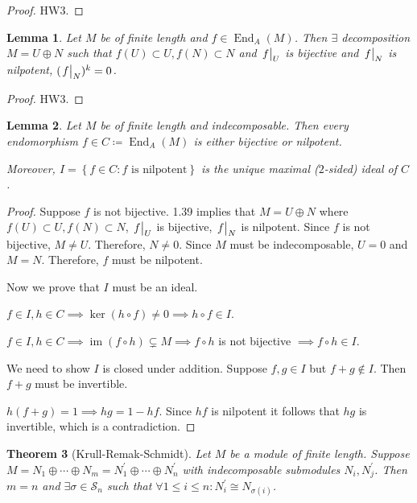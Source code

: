 \documentclass{article}
\theoremstyle{definition}
\theoremstyle{plain}
\newtheorem{theorem}{Theorem}[section]
\newtheorem{lemma}[theorem]{Lemma}
\theoremstyle{remark}
\begin{document}
    \begin{proof}
        HW3.
    \end{proof}

    \begin{lemma}
        Let \(M\) be of finite length and \(f\in \operatorname{End}_A(M)\). Then \(\exists\) decomposition \(M = U \oplus N\) such that \(f(U) \subset U, f(N) \subset N\) and \(\eval{f}_{U}\) is bijective and \(\eval{f}_{N}\) is nilpotent, \((\eval{f}_{N})^k = 0\). 
    \end{lemma}

    \begin{proof}
        HW3.
    \end{proof}

    \begin{lemma}
        Let \(M\) be of finite length and indecomposable. Then every endomorphism \(f\in C \coloneqq \operatorname{End}_A(M)\) is either bijective or nilpotent.

        Moreover, \(I = \left\{ f\in C : f \text{ is nilpotent} \right\} \) is the unique maximal (\(2\)-sided) ideal of \(C\).
    \end{lemma}

    \begin{proof}
        Suppose \(f\) is not bijective. 1.39 implies that \(M = U \oplus N\) where \(f(U) \subset U, f(N) \subset N\), \(\eval{f}_{U}\) is bijective, \(\eval{f}_{N}\) is nilpotent. Since \(f\) is not bijective, \(M\neq U\). Therefore, \(N \neq 0\). Since \(M\) must be indecomposable, \(U = 0\) and \(M = N\). Therefore, \(f\) must be nilpotent.

        Now we prove that \(I\) must be an ideal.

        \(f\in I, h\in C \implies \ker (h \circ  f) \neq 0 \implies h \circ f \in I\).

        \(f\in I, h\in C \implies \operatorname{im} (f \circ h) \subsetneq M \implies f \circ h\) is not bijective \(\implies f \circ h \in I\). 

        We need to show \(I\) is closed under addition. Suppose \(f,g \in I\) but \(f+g\notin I\). Then \(f+g\) must be invertible.

        \(h(f+g)=1 \implies hg = 1-hf\). Since \(hf\) is nilpotent it follows that \(hg\) is invertible, which is a contradiction.
    \end{proof}

    \begin{theorem}
        [Krull-Remak-Schmidt] Let \(M\) be a module of finite length. Suppose \(M = N_1 \oplus \cdots \oplus N_m = N^{\prime}_1 \oplus \cdots \oplus N^{\prime}_n\) with indecomposable submodules \(N_i, N_j^{\prime}\). Then \(m = n\) and \(\exists \sigma \in \mathcal{S}_n\) such that \(\forall 1 \leq i \leq n : N_i^{\prime} \cong N_{\sigma(i)}\).
    \end{theorem}
\end{document}
